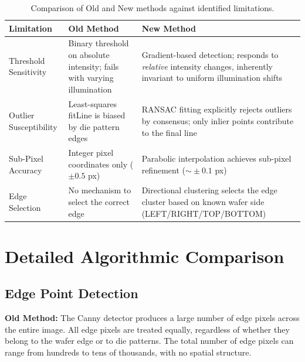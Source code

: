 \documentclass[12pt, a4paper]{article}
\begin{document}
\begin{table}[H]
\centering
\caption{Comparison of Old and New methods against identified limitations.}
\label{tab:comparison}
\renewcommand{\arraystretch}{1.4}
\begin{tabular}{@{}p{3cm}p{5cm}p{5cm}@{}}
\toprule
\textbf{Limitation} & \textbf{Old Method} & \textbf{New Method} \\
\midrule
Threshold Sensitivity &
Binary threshold on absolute intensity; fails with varying illumination &
Gradient-based detection; responds to \emph{relative} intensity changes, inherently invariant to uniform illumination shifts \\
\midrule
Outlier Susceptibility &
Least-squares fitLine is biased by die pattern edges &
RANSAC fitting explicitly rejects outliers by consensus; only inlier points contribute to the final line \\
\midrule
Sub-Pixel Accuracy &
Integer pixel coordinates only ($\pm 0.5$ px) &
Parabolic interpolation achieves sub-pixel refinement ($\sim\!\pm 0.1$ px) \\
\midrule
Edge Selection &
No mechanism to select the correct edge &
Directional clustering selects the edge cluster based on known wafer side (LEFT/RIGHT/TOP/BOTTOM) \\
\bottomrule
\end{tabular}
\end{table}

\section{Detailed Algorithmic Comparison}

\subsection{Edge Point Detection}

\textbf{Old Method:} The Canny detector produces a large number of edge pixels across the entire image. All edge pixels are treated equally, regardless of whether they belong to the wafer edge or to die patterns. The total number of edge pixels can range from hundreds to tens of thousands, with no spatial structure.
\end{document}
